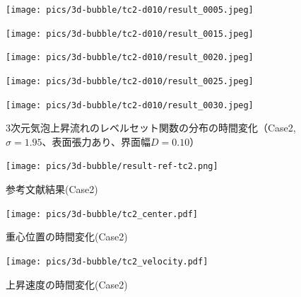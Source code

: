 \begin{figure}[H]
	\centering
	\begin{minipage}[b]{0.16\columnwidth}
	    \centering
	    \texttt{[image: pics/3d-bubble/tc2-d010/result\_0005.jpeg]}
	\end{minipage}
	\begin{minipage}[b]{0.16\columnwidth}
	    \centering
	    \texttt{[image: pics/3d-bubble/tc2-d010/result\_0015.jpeg]}
	\end{minipage}
	\begin{minipage}[b]{0.16\columnwidth}
	    \centering
	    \texttt{[image: pics/3d-bubble/tc2-d010/result\_0020.jpeg]}
	\end{minipage}
	\begin{minipage}[b]{0.16\columnwidth}
	    \centering
	    \texttt{[image: pics/3d-bubble/tc2-d010/result\_0025.jpeg]}
	\end{minipage}
	\begin{minipage}[b]{0.16\columnwidth}
	    \centering
	    \texttt{[image: pics/3d-bubble/tc2-d010/result\_0030.jpeg]}
	\end{minipage}

	\caption{3次元気泡上昇流れのレベルセット関数の分布の時間変化（Case2, $\sigma=1.95$、表面張力あり、界面幅$D=0.10$）}
	\label{fig:3d-bubble_result_tc2}
\end{figure}

\begin{figure}[H]
    \centering
	\texttt{[image: pics/3d-bubble/result-ref-tc2.png]}
	\caption{参考文献結果(Case2)\cite{Safi2017}}
	\label{fig:3d-bubble-result-ref}
\end{figure}

\begin{figure}[H]
	\centering
	\begin{minipage}[b]{0.49\columnwidth}
	    \centering
	    \texttt{[image: pics/3d-bubble/tc2\_center.pdf]}
		\caption{重心位置の時間変化(Case2)}
		\label{fig:3d-bubble-center-tc2}
	\end{minipage}
	\begin{minipage}[b]{0.49\columnwidth}
	    \centering
	    \texttt{[image: pics/3d-bubble/tc2\_velocity.pdf]}
		\caption{上昇速度の時間変化(Case2)}
		\label{fig:3d-bubble-velocity-tc2}
	\end{minipage}
\end{figure}
